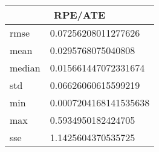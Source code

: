 \begin{table}[!ht] 
 \centering 
 \begin{tabular}{|l|l|} \hline 
 \multicolumn{2}{|c|}{RPE/ATE} \\ \hline 
 rmse & 0.07256208011277626 \\ \hline 
mean & 0.0295768075040808 \\ \hline 
median & 0.015661447072331674 \\ \hline 
std & 0.06626060615599219 \\ \hline 
min & 0.0007204168141535638 \\ \hline 
max & 0.5934950182424705 \\ \hline 
sse & 1.1425604370535725 \\ \hline 
\end{tabular} 
 \end{table}